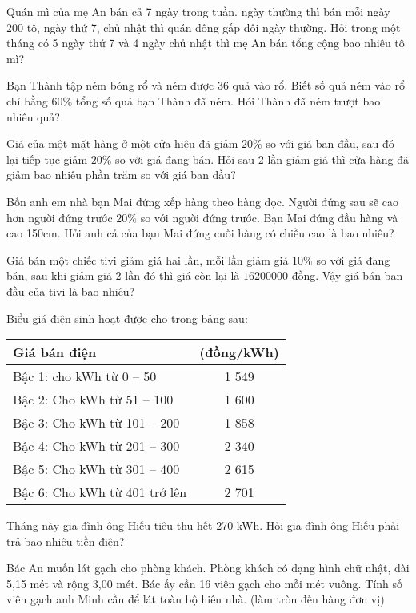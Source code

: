 \bt Quán mì của mẹ An bán cả 7 ngày trong tuần. ngày thường thì bán mỗi ngày 200 tô, ngày thứ 7, chủ nhật thì quán đông gấp đôi ngày thường. Hỏi trong một tháng có 5 ngày thứ 7 và 4 ngày chủ nhật thì mẹ An bán tổng cộng bao nhiêu tô mì?

\bt Bạn Thành tập ném bóng rổ và ném được 36 quả vào rổ. Biết số quả ném vào rổ chỉ bằng $60\% $ tổng số quả bạn Thành đã ném. Hỏi Thành đã ném trượt bao nhiêu quả?

\bt Giá của một mặt hàng ở một cửa hiệu đã giảm $20\% $ so với giá ban đầu, sau đó lại tiếp tục giảm $20\% $ so với giá đang bán. Hỏi sau $2$ lần giảm giá thì cửa hàng đã giảm bao nhiêu phần trăm so với giá ban đầu?

\bt  Bốn anh em nhà bạn Mai đứng xếp hàng theo hàng dọc. Người đứng sau sẽ cao hơn người đứng trước $20\% $ so với người đứng trước. Bạn Mai đứng đầu hàng và cao 150cm. Hỏi anh cả của bạn Mai đứng cuối hàng có chiều cao là bao nhiêu? 

\bt Giá bán một chiếc tivi giảm giá hai lần, mỗi lần giảm giá $10\% $ so với giá đang bán, sau khi giảm giá 2 lần đó thì giá còn lại là $16 200 000$ đồng. Vậy giá bán ban đầu của tivi là bao nhiêu?

\bt Biểu giá điện sinh hoạt được cho trong bảng sau:
\begin{center}

\begin{tabular}{|l|c|}
\hline
Giá bán điện &	(đồng/kWh)\\
\hline
Bậc 1: cho kWh từ 0 – 50 &	1 549\\
\hline
Bậc 2: Cho kWh từ 51 – 100 & 	1 600\\
\hline
Bậc 3: Cho kWh từ 101 – 200	& 1 858\\
\hline
Bậc 4: Cho kWh từ 201 – 300 &	2 340\\
\hline
Bậc 5: Cho kWh từ 301 – 400 &	2 615\\
\hline
Bậc 6: Cho kWh từ 401 trở lên &	2 701\\
\hline
\end{tabular}

\end{center}
Tháng này gia đình ông Hiếu tiêu thụ hết 270 kWh. Hỏi gia đình ông Hiếu phải trả bao nhiêu tiền điện?

\bt Bác An muốn lát gạch cho phòng khách. Phòng khách có dạng hình chữ nhật, dài 5,15 mét và rộng 3,00 mét. Bác ấy cần 16 viên gạch cho mỗi mét vuông. Tính số viên gạch anh Minh cần để lát toàn bộ hiên nhà. (làm tròn đến hàng đơn vị)

